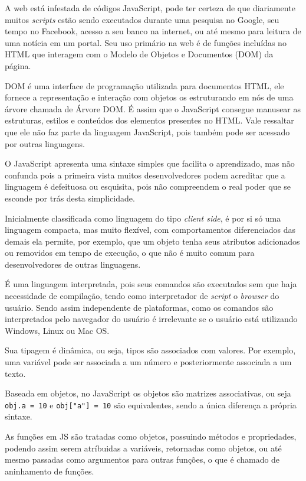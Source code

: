 \documentclass[
	12pt,				%
	openright,			%
	twoside,			%
	a4paper,			%
	english,			%
	brazil				%
	]{abntex2}
\begin{document}
A web está infestada de códigos JavaScript, pode ter certeza de que diariamente muitos \textit{scripts} estão sendo executados durante uma pesquisa no Google, seu tempo no Facebook, acesso a seu banco na internet, ou até mesmo para leitura de uma notícia em um portal. Seu uso primário na web é de funções incluídas no HTML que interagem com o Modelo de Objetos e Documentos (DOM) da página.

DOM é uma interface de programação utilizada para documentos HTML, ele fornece a representação e interação com objetos os estruturando em nós de uma árvore chamada de Árvore DOM. É assim que o JavaScript consegue manusear as estruturas, estilos e conteúdos dos elementos presentes no HTML. Vale ressaltar que ele não faz parte da linguagem JavaScript, pois também pode ser acessado por outras linguagens.

O JavaScript apresenta uma sintaxe simples que facilita o aprendizado, mas não confunda pois a primeira vista muitos desenvolvedores podem acreditar que a linguagem é defeituosa ou esquisita, pois não compreendem o real poder que se esconde por trás desta simplicidade. 

Inicialmente classificada como linguagem do tipo \textit{client side}, é por si só uma linguagem compacta, mas muito flexível, com comportamentos diferenciados das demais ela permite, por exemplo, que um objeto tenha seus atributos adicionados ou removidos em tempo de execução, o que não é muito comum para desenvolvedores de outras linguagens.

É uma linguagem interpretada, pois seus comandos são executados sem que haja necessidade de compilação, tendo como interpretador de \textit{script} o \textit{browser} do usuário. Sendo assim independente de plataformas, como os comandos são interpretados pelo navegador do usuário é irrelevante se o usuário está utilizando Windows, Linux ou Mac OS.

Sua tipagem é dinâmica, ou seja, tipos são associados com valores. Por exemplo, uma variável pode ser associada a um número e posteriormente associada a um texto.

Baseada em objetos, no JavaScript os objetos são matrizes associativas, ou seja \verb|obj.a = 10| e \verb|obj["a"] = 10| são equivalentes, sendo a única diferença a própria sintaxe.

As funções em JS são tratadas como objetos, possuindo métodos e propriedades, podendo assim serem atríbuidas a variáveis, retornadas como objetos, ou até mesmo passadas como argumentos para outras funções, o que é chamado de aninhamento de funções.
\end{document}

